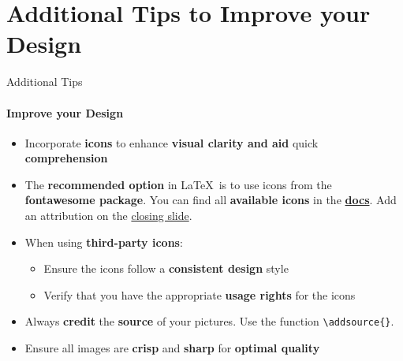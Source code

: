 \documentclass[aspectratio=169]{beamer}
\begin{document}
\section{Additional \textbf{Tips} to Improve your Design}

\begin{frame}
\end{frame}

\begin{frame}{Additional Tips}
    \framesubtitle{Improve your Design}

    \begin{coloredblock}
        \begin{itemize}
            \item Incorporate \textbf{icons} to enhance \textbf{visual clarity and aid }quick \textbf{comprehension}
            \item The \textbf{recommended option} in \LaTeX~is to use icons from the \textbf{fontawesome package}. You can find all \textbf{available icons} in the \href{https://mirror.easyname.at/ctan/fonts/fontawesome5/doc/fontawesome5.pdf}{\textbf{docs}}. Add an attribution on the \hyperlink{frame:closing_slide}{closing slide}.

            \item When using \textbf{third-party icons}:
            \vspace{-0.5\topsep}
            \begin{itemize}
                \item Ensure the icons follow a \textbf{consistent design} style
                \item Verify that you have the appropriate \textbf{usage rights} for the icons
            \end{itemize}
        \end{itemize}
    \end{coloredblock}

        \begin{coloredblock}
            \begin{itemize}
                \item Always \textbf{credit} the \textbf{source} of your pictures. Use the function \texttt{\textbackslash addsource\{\}}.
                \item Ensure all images are \textbf{crisp} and \textbf{sharp} for \textbf{optimal quality}
            \end{itemize}
        \end{coloredblock}
\end{frame}
\end{document}

